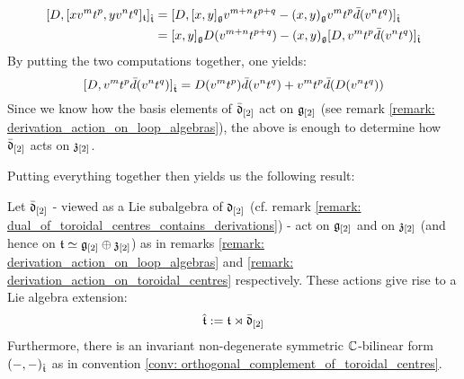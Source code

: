 \begin{remark}
$$                        \begin{aligned}
                            [ D, [x v^m t^p, y v^n t^q]_{\t} ]_{\hat{\t}} & = [ D, [x, y]_{\g} v^{m + n} t^{p + q} - (x, y)_{\g} v^m t^p \bar{d}(v^n t^q) ]_{\hat{\t}}
                            \\
                            & = [x, y]_{\g} D(v^{m + n} t^{p + q}) - (x, y)_{\g} [D, v^m t^p \bar{d}(v^n t^q)]_{\hat{\t}}
                        \end{aligned}
                    $$
                By putting the two computations together, one yields:
                    $$[D, v^m t^p \bar{d}(v^n t^q)]_{\hat{\mathfrak{t}}} = D(v^m t^p) \bar{d}(v^n t^q) + v^m t^p \bar{d}(D(v^n t^q))$$
                Since we know how the basis elements of $\bar{\mathfrak{d}}_{[2]}$ act on $\mathfrak{g}_{[2]}$ (see remark \ref{remark: derivation_action_on_loop_algebras}), the above is enough to determine how $\bar{\mathfrak{d}}_{[2]}$ acts on $\mathfrak{z}_{[2]}$. 
            \end{remark}

            Putting everything together then yields us the following result:
            \begin{proposition} \label{prop: extended_toroidal_lie_algebras}
                Let $\bar{\mathfrak{d}}_{[2]}$ - viewed as a Lie subalgebra of $\mathfrak{d}_{[2]}$ (cf. remark \ref{remark: dual_of_toroidal_centres_contains_derivations}) - act on $\mathfrak{g}_{[2]}$ and on $\mathfrak{z}_{[2]}$ (and hence on $\mathfrak{t} \simeq \mathfrak{g}_{[2]} \oplus \mathfrak{z}_{[2]}$) as in remarks \ref{remark: derivation_action_on_loop_algebras} and \ref{remark: derivation_action_on_toroidal_centres} respectively. These actions give rise to a Lie algebra extension:
                    $$\hat{\mathfrak{t}} := \mathfrak{t} \rtimes \bar{\mathfrak{d}}_{[2]}$$
                Furthermore, there is an invariant non-degenerate symmetric $\mathbb{C}$-bilinear form $(-, -)_{\hat{\mathfrak{t}}}$ as in convention \ref{conv: orthogonal_complement_of_toroidal_centres}. 
            \end{proposition}

